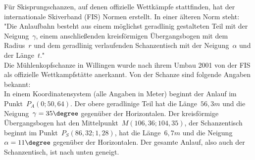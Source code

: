 	Für Skisprungschanzen, auf denen offizielle Wettkämpfe stattfinden, hat der internationale Skiverband (FIS) Normen erstellt. In einer älteren Norm steht:\\
	"Die Anlaufbahn besteht aus einem möglichst geradlinig gestalteten Teil mit der Neigung~$\gamma$, einem anschließenden kreisförmigen Übergangsbogen mit dem Radius~$r$ und dem geradlinig verlaufenden Schanzentisch mit der Neigung~$\alpha$ und der Länge~$t$."\\[0,2cm]
	Die Mühlenkopfschanze in Willingen wurde nach ihrem Umbau 2001 von der FIS als offizielle Wettkampfstätte anerkannt. Von der Schanze sind folgende Angaben bekannt:\\
	In einem Koordinatensystem (alle Angaben in Meter) beginnt der Anlauf im Punkt~$P_A(0;50,64)$. Der obere geradlinige Teil hat die Länge~$56,3m$ und die Neigung~$\gamma=35\degree$ gegenüber der Horizontalen. Der kreisförmige Übergangsbogen hat den Mittelpunkt~$M(106,36;104,35)$, der Schanzentisch beginnt im Punkt~$P_S(86,32;1,28)$, hat die Länge~$6,7m$ und die Neigung~$\alpha=11\degree$ gegenüber der Horizontalen. Der gesamte Anlauf, also auch der Schanzentisch, ist nach unten geneigt.
